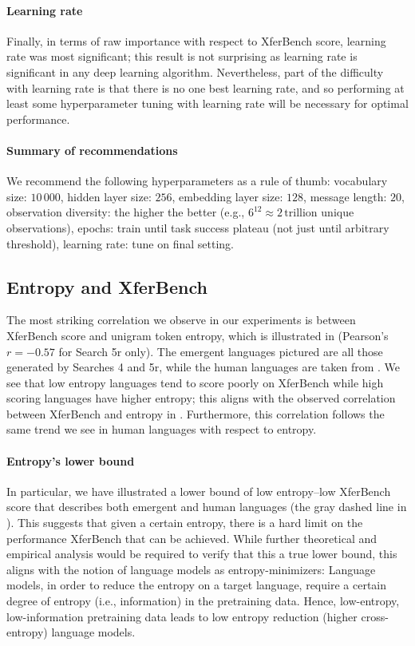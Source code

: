 \paragraph{Learning rate}
Finally, in terms of raw importance with respect to XferBench score, learning rate was most significant; this result is not surprising as learning rate is significant in any deep learning algorithm.
Nevertheless, part of the difficulty with learning rate is that there is no one best learning rate, and so performing at least some hyperparameter tuning with learning rate will be necessary for optimal performance.

\paragraph{Summary of recommendations}
We recommend the following hyperparameters as a rule of thumb:
vocabulary size: $10\,000$,
hidden layer size: $256$,
embedding layer size: $128$,
message length: $20$,
observation diversity: the higher the better (e.g., $6^{12}\approx 2\,\text{trillion}$ unique observations),
epochs: train until task success plateau (not just until arbitrary threshold),
learning rate: tune on final setting.


\subsection{Entropy and XferBench}
\unskip\label{hpo:sec:ent-xb}

The most striking correlation we observe in our experiments is between XferBench score and unigram token entropy, which is illustrated in  (Pearson's $r=-0.57$ for Search 5r only).
The emergent languages pictured are all those generated by Searches 4 and 5r, while the human languages are taken from \citet{boldt-mortensen-2024-xferbench}. 
We see that low entropy languages tend to score poorly on XferBench while high scoring languages have higher entropy; this aligns with the observed correlation between XferBench and entropy in \citet{elcc}.
Furthermore, this correlation follows the same trend we see in human languages with respect to entropy.

\paragraph{Entropy's lower bound}
In particular, we have illustrated a lower bound of low entropy--low XferBench score that describes both emergent and human languages (the gray dashed line in ).
This suggests that given a certain entropy, there is a hard limit on the performance XferBench that can be achieved.
While further theoretical and empirical analysis would be required to verify that this a true lower bound, this aligns with the notion of language models as entropy-minimizers:
Language models, in order to reduce the entropy on a target language, require a certain degree of entropy (i.e., information) in the pretraining data.
Hence, low-entropy, low-information pretraining data leads to low entropy reduction (higher cross-entropy) language models.

